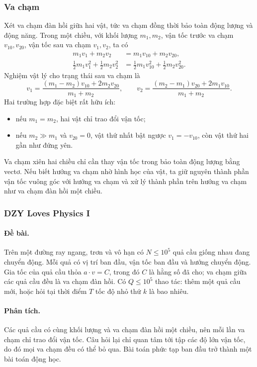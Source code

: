 \documentclass[11pt]{article}
\begin{document}
\subsubsection{Va chạm}

Xét va chạm đàn hồi giữa hai vật, tức va chạm đồng thời bảo toàn động lượng và
động năng. Trong một chiều, với khối lượng \(m_1,m_2\), vận tốc trước va chạm
\(v_{10},v_{20}\), vận tốc sau va chạm \(v_1,v_2\), ta có
\[
\begin{aligned}
  m_1v_1+m_2v_2 &= m_1v_{10}+m_2v_{20},\\
  \frac12m_1v_1^2+\frac12m_2v_2^2
    &=\frac12m_1v_{10}^2+\frac12m_2v_{20}^2.
\end{aligned}
\]
Nghiệm vật lý cho trạng thái sau va chạm là
\[
  v_1=\frac{(m_1-m_2)v_{10}+2m_2v_{20}}{m_1+m_2},
  \qquad
  v_2=\frac{(m_2-m_1)v_{20}+2m_1v_{10}}{m_1+m_2}.
\]
Hai trường hợp đặc biệt rất hữu ích:
\begin{itemize}
  \item nếu \(m_1=m_2\), hai vật chỉ trao đổi vận tốc;
  \item nếu \(m_2\gg m_1\) và \(v_{20}=0\), vật thứ nhất bật ngược
  \(v_1=-v_{10}\), còn vật thứ hai gần như đứng yên.
\end{itemize}

Va chạm xiên hai chiều chỉ cần thay vận tốc trong bảo toàn động lượng bằng
vectơ. Nếu biết hướng va chạm nhờ hình học của vật, ta giữ nguyên thành phần
vận tốc vuông góc với hướng va chạm và xử lý thành phần trên hướng va chạm như
va chạm đàn hồi một chiều.

\subsubsection{DZY Loves Physics I}

\paragraph{Đề bài.}
Trên một đường ray ngang, trơn và vô hạn có \(N\le 10^5\) quả cầu giống nhau
đang chuyển động. Mỗi quả có vị trí ban đầu, vận tốc ban đầu và hướng chuyển
động. Gia tốc của quả cầu thỏa \(a\cdot v=C\), trong đó \(C\) là hằng số đã
cho; va chạm giữa các quả cầu đều là va chạm đàn hồi. Có \(Q\le 10^5\) thao
tác: thêm một quả cầu mới, hoặc hỏi tại thời điểm \(T\) tốc độ nhỏ thứ \(k\) là
bao nhiêu.

\paragraph{Phân tích.}
Các quả cầu có cùng khối lượng và va chạm đàn hồi một chiều, nên mỗi lần va
chạm chỉ trao đổi vận tốc. Câu hỏi lại chỉ quan tâm tới tập các độ lớn vận tốc,
do đó mọi va chạm đều có thể bỏ qua. Bài toán phức tạp ban đầu trở thành một
bài toán động học.
\end{document}
